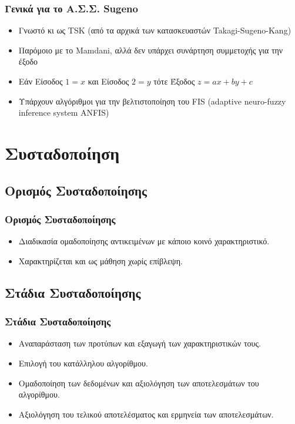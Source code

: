 \documentclass[xetex,serif,mathserif,14pt]{beamer}
\begin{document}
\begin{frame}
\frametitle{Γενικά για το Α.Σ.Σ. Sugeno}
\begin{itemize}
  \item Γνωστό κι ως TSK (από τα αρχικά των κατασκευαστών Takagi-Sugeno-Kang)\pause
  \item Παρόμοιο με το Mamdani, αλλά δεν υπάρχει συνάρτηση συμμετοχής για την έξοδο\pause
  \item Εάν Είσοδος $1 = x$ και Είσοδος $2 = y$ τότε Έξοδος $z = ax + by + c$\pause
  \item Υπάρχουν αλγόριθμοι για την βελτιστοποίηση του FIS (adaptive neuro-fuzzy inference system \textendash ANFIS)
\end{itemize}
\end{frame}


\section{Συσταδοποίηση}

\subsection{Ορισμός Συσταδοποίησης}

\begin{frame}
\frametitle{Ορισμός Συσταδοποίησης}
\begin{itemize}
  \item Διαδικασία ομαδοποίησης αντικειμένων με κάποιο κοινό χαρακτηριστικό.\pause
  \item Χαρακτηρίζεται και ως μάθηση χωρίς επίβλεψη.
\end{itemize}
\end{frame}

\subsection{Στάδια Συσταδοποίησης}

\begin{frame}
\frametitle{Στάδια Συσταδοποίησης}
\begin{itemize}
  \item Αναπαράσταση των προτύπων και εξαγωγή των χαρακτηριστικών τους.\pause
  \item Επιλογή  του  κατάλληλου  αλγορίθμου.\pause
  \item Ομαδοποίηση των δεδομένων και αξιολόγηση των αποτελεσμάτων του αλγορίθμου.\pause
  \item Αξιολόγηση του τελικού αποτελέσματος και ερμηνεία των αποτελεσμάτων.
\end{itemize}
\end{frame}
\end{document}
